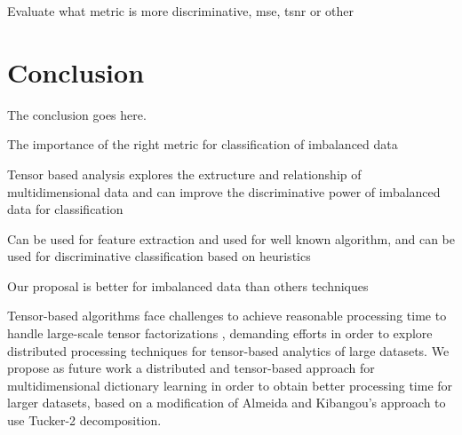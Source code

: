 Evaluate what metric is more discriminative, mse, tsnr or other


\section{Conclusion}
\label{sec:4_conclusion}

The conclusion goes here.

The importance of the right metric for classification of imbalanced data

Tensor based analysis explores the extructure and relationship of multidimensional data and can improve the discriminative power of imbalanced data for classification

Can be used for feature extraction and used for well known algorithm, and can be used for discriminative classification based on heuristics

Our proposal is better for imbalanced data than others techniques

Tensor-based algorithms face challenges to achieve reasonable processing time to handle large-scale tensor factorizations \cite{de2014distributed}, demanding efforts in order to explore distributed processing techniques for tensor-based analytics of large datasets. We propose as future work a distributed and tensor-based approach for multidimensional dictionary learning in order to obtain better processing time for larger datasets, based on a modification of Almeida and Kibangou's \cite{de2014distributed} approach to use Tucker-2 decomposition.